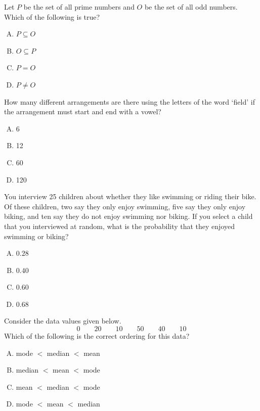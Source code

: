 \documentclass[12pt,letterpaper]{exam}
\begin{document}
\begin{questions}
\vfill

\question Let $P$ be the set of all prime numbers and $O$ be the set of all odd numbers. Which of the following is true?
	\begin{enumerate}[A.]
	\item $P \subseteq O$
	\item $O \subseteq P$
	\item $P= O$
	\item $P \neq O$
	\end{enumerate}

\vfill

\question How many different arrangements are there using the letters of the word `field' if the arrangement must start and end with a vowel?
	\begin{enumerate}[A.]
	\item 6
	\item 12
	\item 60
	\item 120
	\end{enumerate}



\newpage
\vfill



\question You interview 25 children about whether they like swimming or riding their bike. Of these children, two say they only enjoy swimming, five say they only enjoy biking, and ten say they do not enjoy swimming nor biking. If you select a child that you interviewed at random, what is the probability that they enjoyed swimming or biking?
	\begin{enumerate}[A.]
	\item $0.28$
	\item $0.40$
	\item $0.60$
	\item $0.68$
	\end{enumerate}

\vfill

\question Consider the data values given below.
	\[
	0 \qquad 20 \qquad 10 \qquad 50 \qquad 40 \qquad 10
	\]
Which of the following is the correct ordering for this data?
	\begin{enumerate}[A.]
	\item mode $<$ median $<$ mean
	\item median $<$ mean $<$ mode
	\item mean $<$ median $<$ mode
	\item mode $<$ mean $<$ median
	\end{enumerate}


\end{questions}
\end{document}
